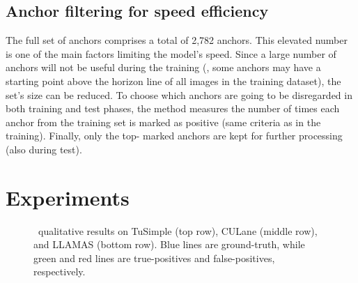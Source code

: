 \documentclass[final]{cvpr}
\begin{document}
	
\subsection{Anchor filtering for speed efficiency}
\label{met:anchor-filtering}

The full set of anchors comprises a total of 2{,}782 anchors. This elevated number is one of the main factors limiting the model's speed. Since a large number of anchors will not be useful during the training (\eg, some anchors may have a starting point above the horizon line of all images in the training dataset), the set's size can be reduced. To choose which anchors are going to be disregarded in both training and test phases, the method measures the number of times each anchor from the training set is marked as positive (same criteria as in the training). Finally, only the top- marked anchors are kept for further processing (also during test).

 \section{Experiments}
\begin{figure}
	\centering
	\vskip -2pt
	\vskip -2pt
	\vskip 4pt
    \centering
	\caption{\methodname~qualitative results on TuSimple (top row), CULane (middle row), and LLAMAS (bottom row). Blue lines are ground-truth, while green and red lines are true-positives and false-positives, respectively.}
	\label{fig:qualitative}
\end{figure}
\end{document}
